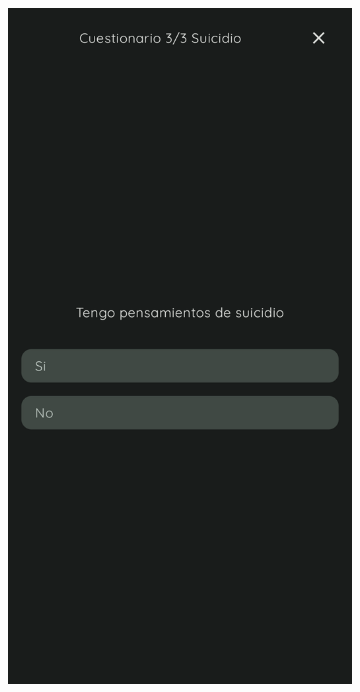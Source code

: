                 \begin{figure}[htbp]
                	\centering
                	\begin{subfigure}[c]{0.4\textwidth}
                		\centering
                		\includegraphics[width=1\textwidth]{figures/pantallas/Suicidio diario.png}

\end{subfigure}
\end{figure}
